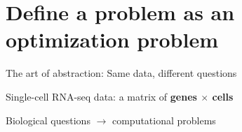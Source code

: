 \documentclass[
  12pt,
  ignorenonframetext,
  aspectratio=169]{beamer}
\begin{document}
\section{Define a problem as an optimization
problem}\label{define-a-problem-as-an-optimization-problem}

\begin{frame}{The art of abstraction: Same data, different questions}
\protect{}\label{the-art-of-abstraction-same-data-different-questions}
\Large

Single-cell RNA-seq data: a matrix of \textbf{genes \(\times\) cells}

\normalsize

\vfill

Biological questions \(\rightarrow\) computational problems
\end{frame}
\end{document}
